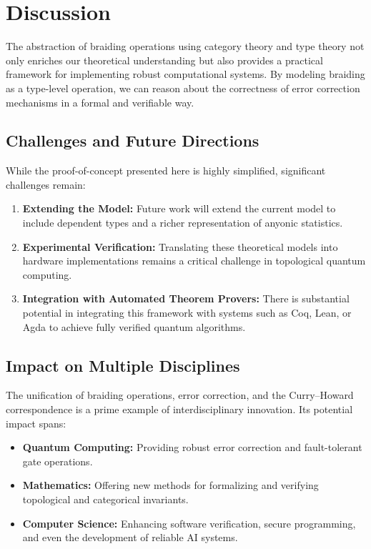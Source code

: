 \documentclass[12pt]{article}
\begin{document}
\section{Discussion}

The abstraction of braiding operations using category theory and type theory not only enriches our theoretical understanding but also provides a practical framework for implementing robust computational systems. By modeling braiding as a type-level operation, we can reason about the correctness of error correction mechanisms in a formal and verifiable way.

\subsection{Challenges and Future Directions}

While the proof-of-concept presented here is highly simplified, significant challenges remain:
\begin{enumerate}[label=(\alph*)]
  \item \textbf{Extending the Model:} Future work will extend the current model to include dependent types and a richer representation of anyonic statistics.
  \item \textbf{Experimental Verification:} Translating these theoretical models into hardware implementations remains a critical challenge in topological quantum computing.
  \item \textbf{Integration with Automated Theorem Provers:} There is substantial potential in integrating this framework with systems such as Coq, Lean, or Agda to achieve fully verified quantum algorithms.
\end{enumerate}

\subsection{Impact on Multiple Disciplines}

The unification of braiding operations, error correction, and the Curry–Howard correspondence is a prime example of interdisciplinary innovation. Its potential impact spans:
\begin{itemize}
  \item \textbf{Quantum Computing:} Providing robust error correction and fault-tolerant gate operations.
  \item \textbf{Mathematics:} Offering new methods for formalizing and verifying topological and categorical invariants.
  \item \textbf{Computer Science:} Enhancing software verification, secure programming, and even the development of reliable AI systems.
\end{itemize}
\end{document}
